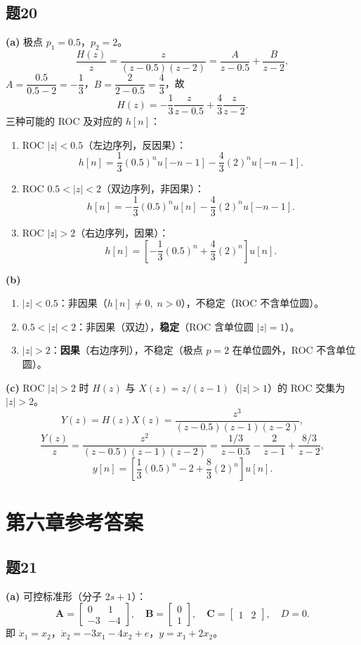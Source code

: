 \documentclass[11pt,a4paper]{ctexart}
\begin{document}
\subsection*{题20}

\textbf{(a)} 极点 $p_1=0.5$，$p_2=2$。
\[
\frac{H(z)}{z}=\frac{z}{(z-0.5)(z-2)}=\frac{A}{z-0.5}+\frac{B}{z-2},
\]
$A=\dfrac{0.5}{0.5-2}=-\dfrac{1}{3}$，$B=\dfrac{2}{2-0.5}=\dfrac{4}{3}$，故
\[
H(z)=-\frac{1}{3}\frac{z}{z-0.5}+\frac{4}{3}\frac{z}{z-2}.
\]
三种可能的 ROC 及对应的 $h[n]$：
\begin{enumerate}[label=(\roman*)]
    \item ROC $|z|<0.5$（左边序列，反因果）：
    \[
    h[n]=\frac{1}{3}(0.5)^n u[-n-1]-\frac{4}{3}(2)^n u[-n-1].
    \]
    \item ROC $0.5<|z|<2$（双边序列，非因果）：
    \[
    h[n]=-\frac{1}{3}(0.5)^n u[n]-\frac{4}{3}(2)^n u[-n-1].
    \]
    \item ROC $|z|>2$（右边序列，因果）：
    \[
    h[n]=\left[-\frac{1}{3}(0.5)^n+\frac{4}{3}(2)^n\right]u[n].
    \]
\end{enumerate}

\textbf{(b)}
\begin{enumerate}[label=(\roman*)]
    \item $|z|<0.5$：非因果（$h[n]\neq 0,\;n>0$），不稳定（ROC 不含单位圆）。
    \item $0.5<|z|<2$：非因果（双边），\textbf{稳定}（ROC 含单位圆 $|z|=1$）。
    \item $|z|>2$：\textbf{因果}（右边序列），不稳定（极点 $p=2$ 在单位圆外，ROC 不含单位圆）。
\end{enumerate}

\textbf{(c)} ROC $|z|>2$ 时 $H(z)$ 与 $X(z)=z/(z-1)$（$|z|>1$）的 ROC 交集为 $|z|>2$。
\[
Y(z)=H(z)X(z)=\frac{z^3}{(z-0.5)(z-1)(z-2)},
\]
\[
\frac{Y(z)}{z}=\frac{z^2}{(z-0.5)(z-1)(z-2)}=\frac{1/3}{z-0.5}-\frac{2}{z-1}+\frac{8/3}{z-2},
\]
\[
y[n]=\left[\frac{1}{3}(0.5)^n-2+\frac{8}{3}(2)^n\right]u[n].
\]

\section{第六章参考答案}

\subsection*{题21}

\textbf{(a)} 可控标准形（分子 $2s+1$）：
\[
\mathbf{A}=\begin{bmatrix}0&1\\-3&-4\end{bmatrix},\quad
\mathbf{B}=\begin{bmatrix}0\\1\end{bmatrix},\quad
\mathbf{C}=\begin{bmatrix}1&2\end{bmatrix},\quad D=0.
\]
即 $\dot x_1=x_2$，$\dot x_2=-3x_1-4x_2+e$，$y=x_1+2x_2$。
\end{document}
